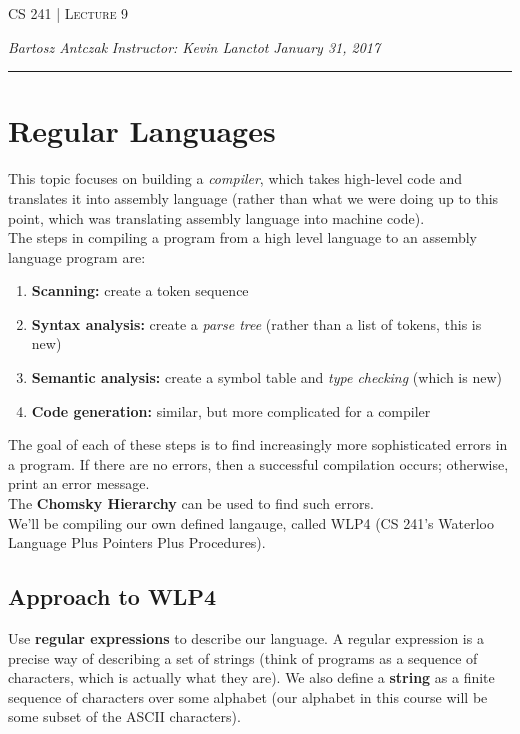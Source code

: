 \documentclass{report}
\newcommand{\lectureNum}{9}
\newcommand{\curDate}{January 31, 2017}
\newcommand{\course}{CS 241}
\newcommand{\instructor}{Kevin Lanctot}
\begin{document}
\begin{center}
\begin{Large}
\textsc{\course{} | Lecture \lectureNum{}}
\end{Large}
\end{center} 
\noindent \textit{Bartosz Antczak} \hfill
\textit{Instructor: \instructor{}} \hfill
\textit{\curDate{}}
\rule{\textwidth}{0.4pt}
\section{Regular Languages}
This topic focuses on building a \textit{compiler}, which takes high-level code and translates it into assembly language (rather than what we were doing up to this point, which was translating assembly language into machine code).\\
The steps in compiling a program from a high level language to an assembly language program are:
\begin{enumerate}
\item \textbf{Scanning:} create a token sequence
\item \textbf{Syntax analysis:} create a \textit{parse tree} (rather than a list of tokens, this is new)
\item \textbf{Semantic analysis:} create a symbol table and \textit{type checking} (which is new)
\item \textbf{Code generation:} similar, but more complicated for a compiler
\end{enumerate}
The goal of each of these steps is to find increasingly more sophisticated errors in a program. If there are no errors, then a successful compilation occurs; otherwise, print an error message.\\
The \textbf{Chomsky Hierarchy} can be used to find such errors.\\
We'll be compiling our own defined langauge, called WLP4 (CS 241's Waterloo Language Plus Pointers Plus Procedures).
\subsection{Approach to WLP4}
Use \textbf{regular expressions} to describe our language. A regular expression is a precise way of describing a set of strings (think of programs as a sequence of characters, which is actually what they are). We also define a \textbf{string} as a finite sequence of characters over some alphabet (our alphabet in this course will be some subset of the ASCII characters).
\end{document}
